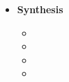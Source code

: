 \documentclass{article}
\begin{document}
\begin{itemize}[label={\textbullet}, left=0.25cm]
\begin{itemize}[label={--}, left=0.25cm]
\begin{itemize}[label={$\cdot$}, left=0.25cm]
        \end{itemize}
    \end{itemize}
    
    \item \textbf{Synthesis}
    \begin{itemize}[label={--}, left=0.25cm]
        \item 
        \item 
        \item 
        \item 
    \end{itemize}
\end{itemize}
\end{document}
